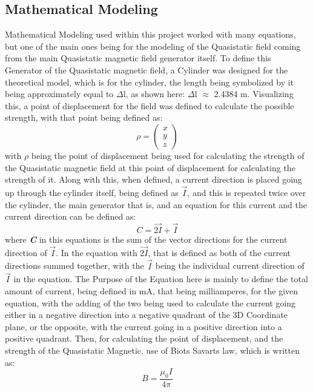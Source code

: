 \documentclass[]{article}
\begin{document}
\subsection*{Mathematical Modeling}
Mathematical Modeling used within this project worked with many equations, but one of the main ones being for the modeling of the Quasistatic field coming from the main Quasistatic magnetic field generator itself. To define this Generator of the Quasistatic magnetic field, a Cylinder was designed for the theoretical model, which is for the cylinder, the length being symbolized by it being approximately equal to $\Delta$l, as shown here: $\Delta$l $\approx$ 2.4384 m. Visualizing this, a point of displacement for the field was defined to calculate the possible strength, with that point being defined as:
\begin{equation}
\rho =  \left(\begin{array}{c}
x \\
y \\
z 
\end{array}\right)
\end{equation}
with $\rho$ being the point of displacement being used for calculating the strength of the Quasistatic magnetic field at this point of displacement for calculating the strength of it. Along with this, when defined, a current direction is placed going up through the cylinder itself, being defined as $\vec{I}$, and this is repeated twice over the cylinder, the main generator that is, and an equation for this current and the current direction can be defined as:
\begin{equation}
C = \vec{2I} + \vec{I}
\end{equation}
where \textbf{\textit{C}} in this equations is the sum of the vector directions for the current direction of $\vec{I}$. In the equation with $\vec{2I}$, that is defined as both of the current directions summed together, with the $\vec{I}$ being the individual current direction of $\vec{I}$ in the equation. The Purpose of the Equation here is mainly to define the total amount of current, being defined in mA, that being milliamperes, for the given equation, with the adding of the two being used to calculate the current going either in a negative direction into a negative quadrant of the 3D Coordinate plane, or the opposite, with the current going in a positive direction into a positive quadrant. Then, for calculating the point of displacement, and the strength of the Quasistatic Magnetic, use of Biots Savarts law, which is written as:
\begin{equation}
B = \frac{\mu_0I}{4\pi}
\end{equation}
\end{document}
